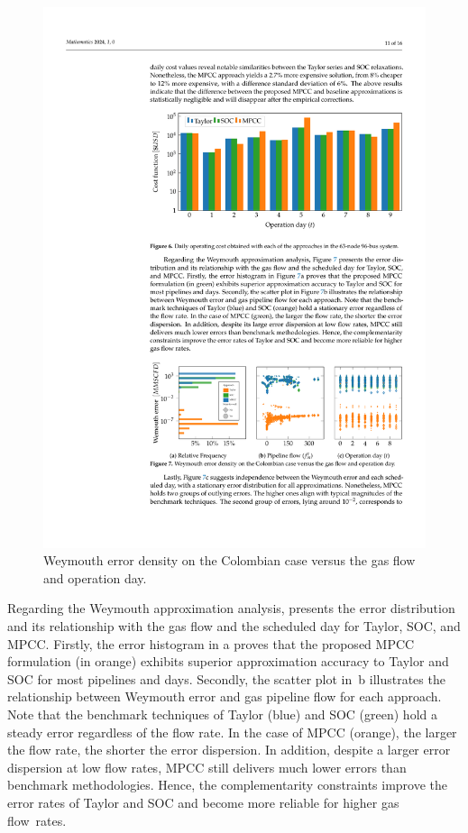 \begin{figure}[h]
   \includegraphics[scale=0.98]{figures/Chapter_MPCC/g006.pdf}
\caption{Weymouth error density on the Colombian case versus the gas flow and operation day.}\label{fig:red_test_error}
\end{figure}


Regarding the Weymouth approximation analysis,  presents the error distribution and its relationship with the gas flow and the scheduled day for Taylor, SOC, and MPCC. Firstly, the error histogram in a proves that the proposed MPCC formulation (in orange) exhibits superior approximation accuracy to Taylor and SOC for most pipelines and days. Secondly, the scatter plot in~b  illustrates the relationship between Weymouth error and gas pipeline flow for each approach. Note that the benchmark techniques of Taylor (blue) and SOC (green) hold a steady error regardless of the flow rate. In the case of MPCC (orange), the larger the flow rate, the shorter the error dispersion. In addition, despite a larger error dispersion at low flow rates, MPCC still delivers much lower errors than benchmark methodologies. Hence, the complementarity constraints improve the error rates of Taylor and SOC and become more reliable for higher gas \mbox{flow rates}.



